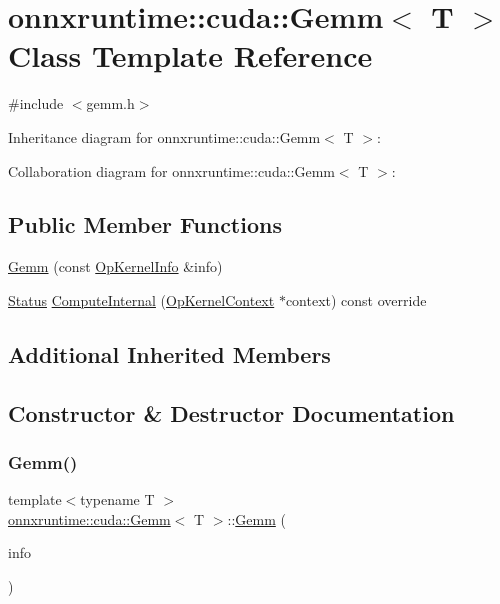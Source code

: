 \hypertarget{classonnxruntime_1_1cuda_1_1Gemm}{}\section{onnxruntime\+:\+:cuda\+:\+:Gemm$<$ T $>$ Class Template Reference}
\label{classonnxruntime_1_1cuda_1_1Gemm}


{\ttfamily \#include $<$gemm.\+h$>$}



Inheritance diagram for onnxruntime\+:\+:cuda\+:\+:Gemm$<$ T $>$\+:


Collaboration diagram for onnxruntime\+:\+:cuda\+:\+:Gemm$<$ T $>$\+:
\subsection*{Public Member Functions}
\begin{DoxyCompactItemize}
\item 
\mbox{\hyperlink{classonnxruntime_1_1cuda_1_1Gemm_a7c6f6c5be61bd15b584fd8f3093aa299}{Gemm}} (const \mbox{\hyperlink{classonnxruntime_1_1OpKernelInfo}{Op\+Kernel\+Info}} \&info)
\item 
\mbox{\hyperlink{classonnxruntime_1_1common_1_1Status}{Status}} \mbox{\hyperlink{classonnxruntime_1_1cuda_1_1Gemm_a932d9e5843b6350ad6d97247d4a162e0}{Compute\+Internal}} (\mbox{\hyperlink{classonnxruntime_1_1OpKernelContext}{Op\+Kernel\+Context}} $\ast$context) const override
\end{DoxyCompactItemize}
\subsection*{Additional Inherited Members}


\subsection{Constructor \& Destructor Documentation}
\mbox{\label{classonnxruntime_1_1cuda_1_1Gemm_a7c6f6c5be61bd15b584fd8f3093aa299}} 
\subsubsection{\texorpdfstring{Gemm()}{Gemm()}}
{\footnotesize\ttfamily template$<$typename T $>$ \\
\mbox{\hyperlink{classonnxruntime_1_1cuda_1_1Gemm}{onnxruntime\+::cuda\+::\+Gemm}}$<$ T $>$\+::\mbox{\hyperlink{classonnxruntime_1_1cuda_1_1Gemm}{Gemm}} (\begin{DoxyParamCaption}\item[{const \mbox{\hyperlink{classonnxruntime_1_1OpKernelInfo}{Op\+Kernel\+Info}} \&}]{info }\end{DoxyParamCaption})\hspace{0.3cm}{\ttfamily [inline]}}



